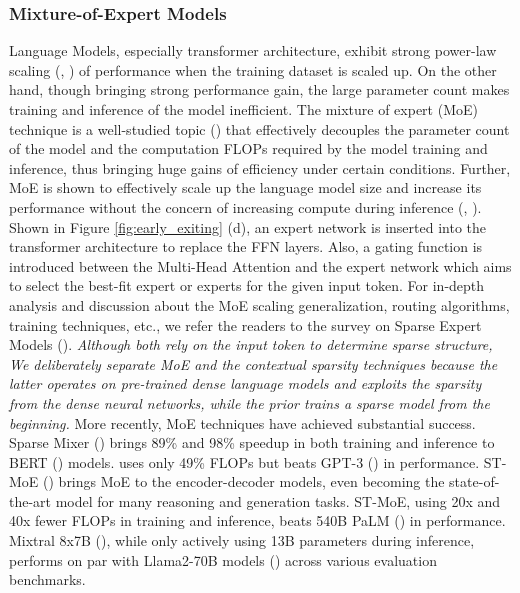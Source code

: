 \subsubsection{Mixture-of-Expert Models} \label{mioe} 
Language Models, especially transformer architecture, exhibit strong power-law scaling (\cite{kaplan2020scaling}, \cite{hoffmann2022training}) of performance when the training dataset is scaled up. On the other hand, though bringing strong performance gain, the large parameter count makes training and inference of the model inefficient. The mixture of expert (MoE) technique is a well-studied topic (\cite{6215056}) that effectively decouples the parameter count of the model and the computation FLOPs required by the model training and inference, thus bringing huge gains of efficiency under certain conditions. Further, MoE is shown to effectively scale up the language model size and increase its performance without the concern of increasing compute during inference (\cite{lepikhin2020gshard}, \cite{fedus2021switch}). Shown in Figure \ref{fig:early_exiting} (d), an expert network is inserted into the transformer architecture to replace the FFN layers. Also, a gating function is introduced between the Multi-Head Attention and the expert network which aims to select the best-fit expert or experts for the given input token. For in-depth analysis and discussion about the MoE scaling generalization, routing algorithms, training techniques, etc., we refer the readers to the survey on Sparse Expert Models (\cite{fedus2022review}). 
\textit{Although both rely on the input token to determine sparse structure, We deliberately separate MoE and the contextual sparsity techniques because the latter operates on pre-trained dense language models and exploits the sparsity from the dense neural networks, while the prior trains a sparse model from the beginning.} 
More recently, MoE techniques have achieved substantial success. Sparse Mixer (\cite{lee2022sparse}) brings 89\% and 98\% speedup in both training and inference to BERT (\cite{devlin2019bert}) models. \cite{du2022glam} uses only 49\% FLOPs but beats GPT-3 (\cite{brown2020language}) in performance. ST-MoE (\cite{zoph2022st}) brings MoE to the encoder-decoder models, even becoming the state-of-the-art model for many reasoning and generation tasks. ST-MoE, using 
20x and 40x fewer FLOPs in training and inference, beats 540B PaLM (\cite{chowdhery2022palm}) in performance. Mixtral 8x7B (\cite{jiang2024mixtral}), while only actively using 13B parameters during inference, performs on par with Llama2-70B models (\cite{touvron2023llama2}) across various evaluation benchmarks. 

